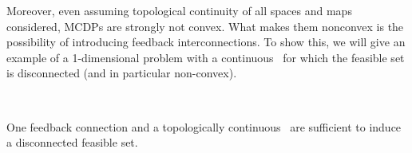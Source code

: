 
Moreover, even assuming topological continuity of all spaces and maps
considered, MCDPs are strongly not convex. What makes them nonconvex
is the possibility of introducing feedback interconnections. To show
this, we will give an example of a 1-dimensional problem with a continuous~\ftor
for which the feasible set is disconnected (and in particular non-convex).

\begin{marginfigure}
    \centering
    \\
    \caption{One feedback connection and a topologically continuous~\ftor
    are sufficient to induce a disconnected feasible set.}
    \label{fig:ceil-1}
\end{marginfigure}


